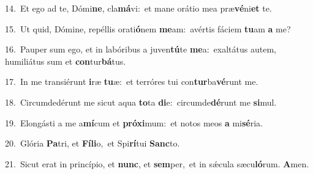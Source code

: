 {\numbfont\textcolor{\numbcolor}{14.}}~Et ego ad te, Dómi\-\textbf{ne}\-, cla\-\textbf{má}\-vi:~\star et mane orátio mea præ\-\textbf{vé}\-ni\textbf{et} te.\par
{\numbfont\textcolor{\numbcolor}{15.}}~Ut quid, Dómine, repéllis orati\-\textbf{ó}\-nem \textbf{me}\-am:~\star avértis fáciem \textbf{tu}\-am \textbf{a} me?\par
{\numbfont\textcolor{\numbcolor}{16.}}~Pauper sum ego, et in labóribus a juven\-\textbf{tú}\-te \textbf{me}\-a:~\star exaltátus autem, humiliátus sum et \textbf{con}\-tur\-\textbf{bá}\-tus.\par
{\numbfont\textcolor{\numbcolor}{17.}}~In me transiérunt \textbf{i}\-ræ \textbf{tu}\-æ:~\star et terróres tui con\-\textbf{tur}\-ba\-\textbf{vé}\-runt me.\par
{\numbfont\textcolor{\numbcolor}{18.}}~Circumdedérunt me sicut aqua \textbf{to}\-ta \textbf{di}\-e:~\star circumde\-\textbf{dé}\-runt me \textbf{si}\-mul.\par
{\numbfont\textcolor{\numbcolor}{19.}}~Elongásti a me a\-\textbf{mí}\-cum et \textbf{pró}\-\textbf{xi}mum:~\star et notos meos \textbf{a} mi\-\textbf{sé}\-ria.\par
{\numbfont\textcolor{\numbcolor}{20.}}~Glória \textbf{Pa}\-tri, et \textbf{Fí}\-\textbf{li}o,~\star et Spi\-\textbf{rí}\-tui \textbf{Sanc}\-to.\par
{\numbfont\textcolor{\numbcolor}{21.}}~Sicut erat in princípio, et \textbf{nunc}\-, et \textbf{sem}\-per,~\star et in sǽcula sæcu\-\textbf{ló}\-rum. \textbf{A}\-men.\par
